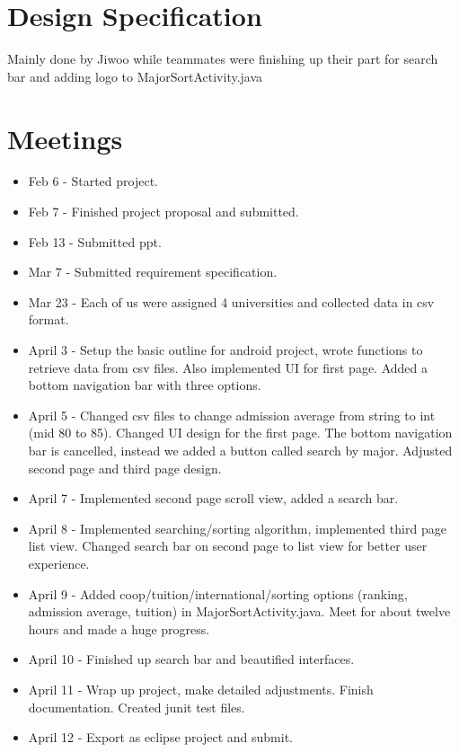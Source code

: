 \documentclass{article}
\begin{document}
\section{Design Specification}

Mainly done by Jiwoo while teammates were finishing up their part for search bar and adding logo to MajorSortActivity.java

\section{Meetings}

\begin{itemize} 
	\item Feb 6 - Started project.
	\item Feb 7 - Finished project proposal and submitted.
	\item Feb 13 - Submitted ppt.
	\item Mar 7 - Submitted requirement specification.
	\item Mar 23 - Each of us were assigned 4 universities and collected data in csv format.
	\item April 3 - Setup the basic outline for android project, wrote functions to retrieve data from csv files. Also implemented UI for first page. Added a bottom navigation bar with three options.
	\item April 5 - Changed csv files to change admission average from string to int (mid 80 to 85). Changed UI design for the first page. The bottom navigation bar is cancelled, instead we added a button called search by major. Adjusted second page and third page design.
	\item April 7 - Implemented second page scroll view, added a search bar.
	\item April 8 - Implemented searching/sorting algorithm, implemented third page list view. Changed search bar on second page to list view for better user experience.
	\item April 9 - Added coop/tuition/international/sorting options (ranking, admission average, tuition) in MajorSortActivity.java. Meet for about twelve hours and made a huge progress.
	\item April 10 - Finished up search bar and beautified interfaces.
	\item April 11 - Wrap up project, make detailed adjustments. Finish documentation. Created junit test files.
	\item April 12 - Export as eclipse project and submit.
	
\end{itemize}
\end{document}
